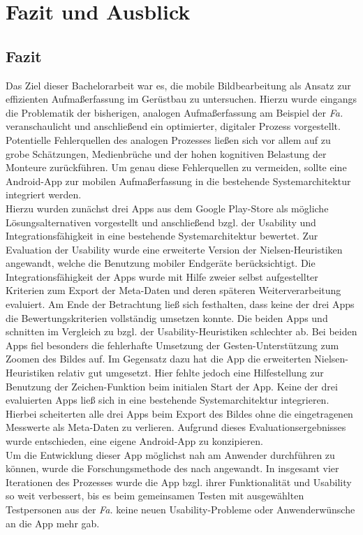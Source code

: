 \chapter{Fazit und Ausblick}
\section{Fazit}
Das Ziel dieser Bachelorarbeit war es, die mobile Bildbearbeitung als Ansatz zur effizienten Aufmaßerfassung im Gerüstbau zu untersuchen.
Hierzu wurde eingangs die Problematik der bisherigen, analogen Aufmaßerfassung am Beispiel der \emph{Fa.} \vr{} veranschaulicht und anschließend ein optimierter, digitaler Prozess vorgestellt.
Potentielle Fehlerquellen des analogen Prozesses ließen sich vor allem auf zu grobe Schätzungen, Medienbrüche und der hohen kognitiven Belastung der Monteure zurückführen.
Um genau diese Fehlerquellen zu vermeiden, sollte eine Android-App zur mobilen Aufmaßerfassung in die bestehende Systemarchitektur integriert werden. \\

Hierzu wurden zunächst drei Apps aus dem Google Play-Store als mögliche Lösungsalternativen vorgestellt und anschließend bzgl. der Usability und Integrationsfähigkeit in eine bestehende Systemarchitektur bewertet.
Zur Evaluation der Usability wurde eine erweiterte Version der Nielsen-Heuristiken angewandt, welche die Benutzung mobiler Endgeräte berücksichtigt.
Die Integrationsfähigkeit der Apps wurde mit Hilfe zweier selbst aufgestellter Kriterien zum Export der Meta-Daten und deren späteren Weiterverarbeitung evaluiert.
Am Ende der Betrachtung ließ sich festhalten, dass keine der drei Apps die Bewertungskriterien vollständig umsetzen konnte.
Die beiden Apps \mm{} und \pm{} schnitten im Vergleich zu \im{} bzgl. der Usability-Heuristiken schlechter ab.
Bei beiden Apps fiel besonders die fehlerhafte Umsetzung der Gesten-Unterstützung zum Zoomen des Bildes auf.
Im Gegensatz dazu hat die App \im{} die erweiterten Nielsen-Heuristiken relativ gut umgesetzt.
Hier fehlte jedoch eine Hilfestellung zur Benutzung der Zeichen-Funktion beim initialen Start der App.
Keine der drei evaluierten Apps ließ sich in eine bestehende Systemarchitektur integrieren.
Hierbei scheiterten alle drei Apps beim Export des Bildes ohne die eingetragenen Messwerte als Meta-Daten zu verlieren.
Aufgrund dieses Evaluationsergebnisses wurde entschieden, eine eigene Android-App zu konzipieren. \\

Um die Entwicklung dieser App möglichst nah am Anwender durchführen zu können, wurde die Forschungsmethode des \hcdp{} nach \citet{Norman13} angewandt.
In insgesamt vier Iterationen des Prozesses wurde die App bzgl. ihrer Funktionalität und Usability so weit verbessert, bis es beim gemeinsamen Testen mit ausgewählten Testpersonen aus der \emph{Fa.} \vr{} keine neuen Usability-Probleme oder Anwenderwünsche an die App mehr gab. \\

